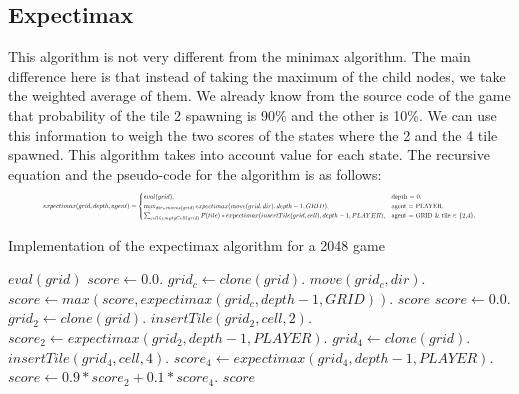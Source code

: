 \documentclass[english]{article}
\begin{document}
\subsection*{Expectimax}
This algorithm is not very different from the minimax algorithm. The main difference here is that instead of taking the maximum of the child nodes, we take the weighted average of them. We already know from the source code of the game that probability of the tile 2 spawning is 90\% and the other is 10\%. We can use this information to weigh the two scores of the states where the 2 and the 4 tile spawned. This algorithm takes into account value for each state. The recursive equation and the pseudo-code for the algorithm is as follows:
\begin{displaymath}
\resizebox{.9\hsize}{!}{$expectimax(grid, depth, agent) =\begin{cases}
    eval(grid), & \text{depth = 0}.\\
    \max_{dir \in moves(grid)} expectimax(move(grid, dir), depth-1, GRID), & \text{agent = PLAYER}.\\
    \sum_{cell \in emptyCell(grid)} P(tile) * expectimax(insertTile(grid, cell), depth-1, PLAYER), & \text{agent = GRID \& tile $\in$ \{2,4\}}.\end{cases}$}
\end{displaymath}

\begin{algorithm}
\caption{Implementation of the expectimax algorithm for a 2048 game}
\begin{algorithmic}[1]
 \Return $\textit{eval}(grid)$
\State $score \gets 0.0$.
\State $grid_c \gets clone(grid)$.
\State $move(grid_c, dir)$.
\State $score \gets max(score, expectimax(grid_c, depth-1, GRID))$.
\EndFor
\Return $\textit{score}$
\State $score \gets 0.0$.
\State $grid_2 \gets clone(grid)$.
\State $insertTile(grid_2, cell, 2)$.
\State $score_2 \gets expectimax(grid_2, depth-1, PLAYER)$.
\State $grid_4 \gets clone(grid)$.
\State $insertTile(grid_4, cell, 4)$.
\State $score_4 \gets expectimax(grid_4, depth-1, PLAYER)$.
\State $score \gets 0.9 * score_2 + 0.1 * score_4$.
\EndFor
\Return $\textit{score}$
\EndIf
\EndProcedure
\end{algorithmic}
\end{algorithm}
\end{document}
